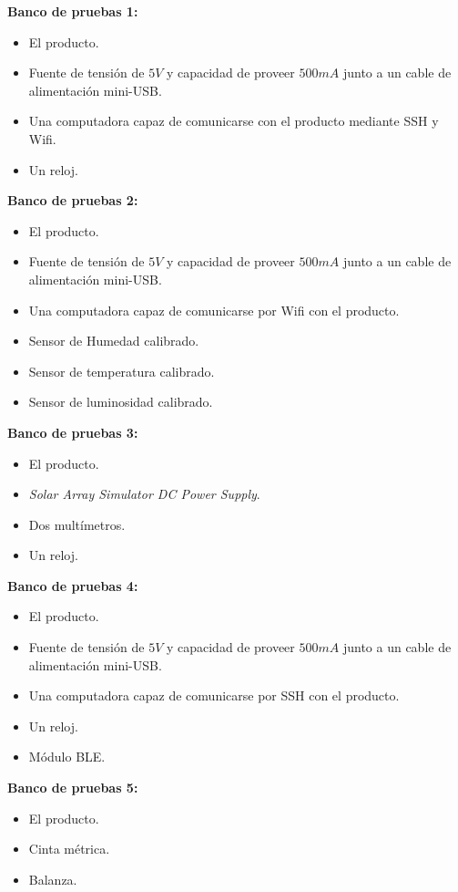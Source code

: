 \textbf{Banco de pruebas 1:}
\begin{itemize}
	\item El producto.	
	\item Fuente de tensión de $5V$ y capacidad de proveer $500mA$ junto a un cable de alimentación mini-USB.
	\item Una computadora capaz de comunicarse con el producto mediante SSH y Wifi.
	\item Un reloj.
\end{itemize}

\textbf{Banco de pruebas 2:}
\begin{itemize}
	\item El producto.	
	\item Fuente de tensión de $5V$ y capacidad de proveer $500mA$ junto a un cable de alimentación mini-USB.
	\item Una computadora capaz de comunicarse por Wifi con el producto.
	\item Sensor de Humedad calibrado.
	\item Sensor de temperatura calibrado.
	\item Sensor de luminosidad calibrado.
\end{itemize}

\textbf{Banco de pruebas 3:}
\begin{itemize}
	\item El producto.
	\item \textit{Solar Array Simulator DC Power Supply}.
	\item Dos multímetros.
	\item Un reloj.
\end{itemize}

\textbf{Banco de pruebas 4:}
\begin{itemize}
	\item El producto.	
	\item Fuente de tensión de $5V$ y capacidad de proveer $500mA$ junto a un cable de alimentación mini-USB.
	\item Una computadora capaz de comunicarse por SSH con el producto.
	\item Un reloj.
	\item Módulo BLE.
\end{itemize}


\textbf{Banco de pruebas 5:}
\begin{itemize}
	\item El producto.
	\item Cinta métrica.
	\item Balanza.
\end{itemize}